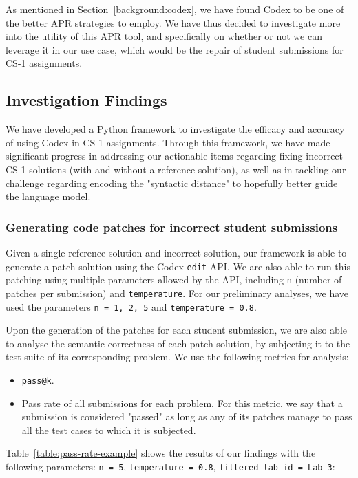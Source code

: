 As mentioned in Section~\ref{background:codex}, we have found Codex to be one of the better
APR strategies to employ.
We have thus decided to investigate more into the utility of
\href{https://openai.com/blog/openai-codex/}{this APR tool},
and specifically on whether or not we can leverage it in our use case, which would be the repair
of student submissions for CS-1 assignments.

\subsection{Investigation Findings}

We have developed a Python framework to investigate the efficacy and accuracy of using Codex in
CS-1 assignments.
Through this framework, we have made significant progress in addressing our actionable items regarding
fixing incorrect CS-1 solutions (with and without a reference solution), as well as in tackling our
challenge regarding encoding the "syntactic distance" to hopefully better guide the language model.

\subsubsection{Generating code patches for incorrect student submissions}

Given a single reference solution and incorrect solution, our framework is able to generate a patch
solution using the Codex \texttt{edit} API. We are also able to run this patching using multiple
parameters allowed by the API, including \texttt{n} (number of patches per submission) and
\texttt{temperature}.
For our preliminary analyses, we have used the parameters \texttt{n = 1, 2, 5} and
\texttt{temperature = 0.8}.

Upon the generation of the patches for each student submission, we are also able to analyse the
semantic correctness of each patch solution, by subjecting it to the test suite of its corresponding
problem.
We use the following metrics for analysis:
\begin{itemize}
    \item \texttt{pass@k}.
    \item Pass rate of all submissions for each problem.
          For this metric, we say that a submission is considered "passed" as long as any of its
          patches manage to pass all the test cases to which it is subjected.
\end{itemize}

Table~\ref{table:pass-rate-example} shows the results of our findings with the following
parameters: \texttt{n = 5}, \texttt{temperature = 0.8}, \texttt{filtered\_lab\_id = Lab-3}:

